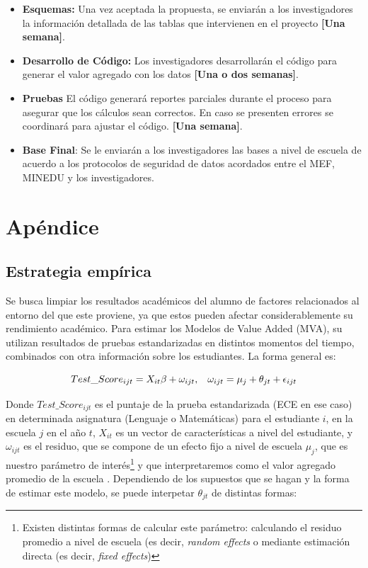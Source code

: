 \documentclass[11pt]{article}
\numberwithin{equation}{section}
\begin{document}
\begin{itemize}
\begin{itemize}
\item {\bf Esquemas:} Una vez aceptada la propuesta, se enviar\'an a los investigadores la informaci\'on detallada de las tablas que intervienen en el proyecto {\bf [Una semana]}.

\item {\bf Desarrollo de C\'odigo:} Los investigadores desarrollar\'an  el c\'odigo para generar el valor agregado con los datos  {\bf [Una o dos semanas]}.

\item {\bf Pruebas} El c\'odigo generar\'a reportes parciales durante el proceso para asegurar que los c\'alculos sean correctos. En caso se presenten errores se coordinar\'a para ajustar el c\'odigo.  {\bf [Una semana]}. 

\item {\bf Base Final}: Se le enviar\'an a los investigadores las bases a nivel de escuela de acuerdo a los protocolos de seguridad de datos acordados entre el MEF, MINEDU y los investigadores.

\end{itemize}	

\end{itemize}

\newpage

\section*{Ap\'endice}
  

\subsection*{\bf Estrategia emp\'irica}  
Se busca limpiar los resultados acad\'emicos del alumno de factores relacionados al entorno del que este proviene, ya que estos pueden afectar considerablemente su rendimiento acad\'emico. Para estimar los Modelos de Value Added (MVA), su utilizan resultados de pruebas estandarizadas en distintos momentos del tiempo, combinados con otra informaci\'on sobre los estudiantes. La forma general es:

\begin{equation}\label{eq:qualityOLS}
Test\_Score_{ijt}= X_{it} \beta + \omega_{ijt}, \hspace{0.3cm} \omega_{ijt}=\mu_j+\theta_{jt}+\epsilon_{ijt}
\end{equation}

Donde $Test\_Score_{ijt}$ es el puntaje de la prueba estandarizada (ECE en ese caso) en determinada asignatura (Lenguaje o Matem\'aticas) para el estudiante $i$, en la escuela $j$ en el a\~no $t$, $X_{it}$ es un vector de caracter\'isticas a nivel del estudiante, y $\omega_{ijt}$ es el residuo, que se compone de un efecto fijo a nivel de escuela $\mu_j$, que es nuestro par\'ametro de inter\'es\footnote{Existen distintas formas de calcular este par\'ametro: calculando el residuo promedio a nivel de escuela (es decir, {\it random effects} o mediante estimaci\'on directa (es decir, {\it fixed effects})} y que interpretaremos como el valor agregado promedio de la escuela
. Dependiendo de los supuestos que se hagan y la forma de estimar este modelo, se puede interpetar $\theta_{jt}$ de distintas formas: 
\end{document}
